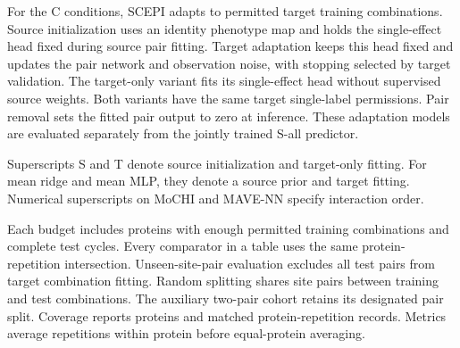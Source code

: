 \documentclass{llncs}
\begin{document}
For the C conditions, SCEPI adapts to permitted target training combinations. Source initialization uses an identity phenotype map and holds the single-effect head fixed during source pair fitting. Target adaptation keeps this head fixed and updates the pair network and observation noise, with stopping selected by target validation. The target-only variant fits its single-effect head without supervised source weights. Both variants have the same target single-label permissions. Pair removal sets the fitted pair output to zero at inference. These adaptation models are evaluated separately from the jointly trained S-all predictor.

Superscripts S and T denote source initialization and target-only fitting. For mean ridge and mean MLP, they denote a source prior and target fitting. Numerical superscripts on MoCHI and MAVE-NN specify interaction order.

Each budget includes proteins with enough permitted training combinations and complete test cycles. Every comparator in a table uses the same protein-repetition intersection. Unseen-site-pair evaluation excludes all test pairs from target combination fitting. Random splitting shares site pairs between training and test combinations. The auxiliary two-pair cohort retains its designated pair split. Coverage reports proteins and matched protein-repetition records. Metrics average repetitions within protein before equal-protein averaging.
\end{document}
